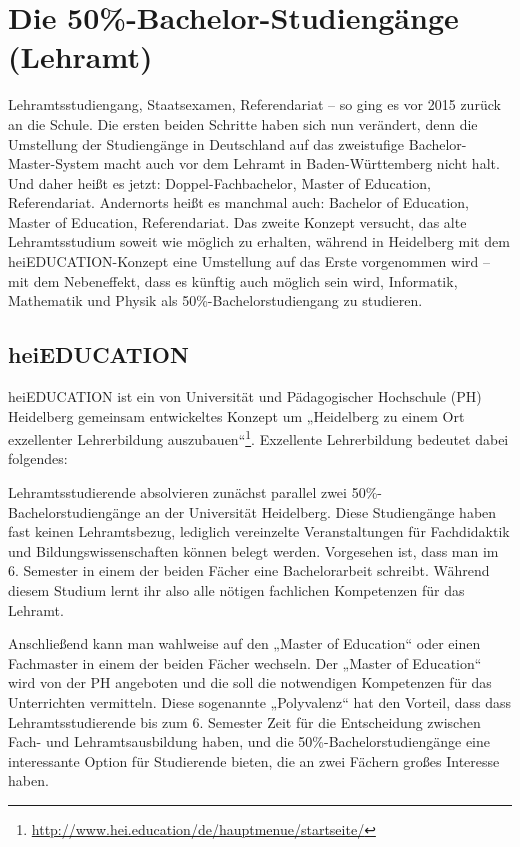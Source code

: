 \section{Die 50\%-Bachelor-Studiengänge (Lehramt)} %
\label{lehramt_allg}

Lehramtsstudiengang, Staatsexamen, Referendariat -- so ging es vor 2015 zurück
an die Schule.  Die ersten beiden Schritte haben sich nun verändert, denn die
Umstellung der Studiengänge in Deutschland auf das zweistufige
Bachelor-Master-System macht auch vor dem Lehramt in Baden-Württemberg nicht
halt. Und daher heißt es jetzt: Doppel-Fachbachelor, Master of Education,
Referendariat. Andernorts heißt es manchmal auch: Bachelor of Education, Master
of Education, Referendariat. Das zweite Konzept versucht, das alte
Lehramtsstudium soweit wie möglich zu erhalten, während in Heidelberg mit dem
heiEDUCATION-Konzept eine Umstellung auf das Erste vorgenommen wird -- mit dem
Nebeneffekt, dass es künftig auch möglich sein wird, Informatik, Mathematik und
Physik als 50\%-Bachelorstudiengang zu studieren.

\subsection{heiEDUCATION}

heiEDUCATION ist ein von Universität und Pädagogischer Hochschule (PH)
Heidelberg gemeinsam entwickeltes Konzept um „Heidelberg zu einem Ort
exzellenter Lehrerbildung
auszubauen“\footnote{\url{http://www.hei.education/de/hauptmenue/startseite/}}.
Exzellente Lehrerbildung bedeutet dabei folgendes:

Lehramtsstudierende absolvieren zunächst parallel zwei
50\%-Ba\-che\-lor\-stu\-di\-en\-gän\-ge an der Universität Heidelberg. Diese
Studiengänge haben fast keinen Lehramtsbezug, lediglich vereinzelte
Veranstaltungen für Fachdidaktik und Bildungswissenschaften können belegt
werden. Vorgesehen ist, dass man im 6. Semester in einem der beiden Fächer eine
Bachelorarbeit schreibt. Während diesem Studium lernt ihr also alle nötigen
fachlichen Kompetenzen für das Lehramt.

Anschließend kann man wahlweise auf den „Master of Education“ oder einen
Fachmaster in einem der beiden Fächer wechseln. Der „Master of Education“ wird
von der PH angeboten und die soll die notwendigen Kompetenzen für das
Unterrichten vermitteln.  Diese sogenannte „Polyvalenz“ hat den Vorteil, dass
dass Lehramtsstudierende bis zum 6. Semester Zeit für die Entscheidung zwischen
Fach- und Lehramtsausbildung haben, und die 50\%-Bachelorstudiengänge eine
interessante Option für Studierende bieten, die an zwei Fächern großes
Interesse haben.

